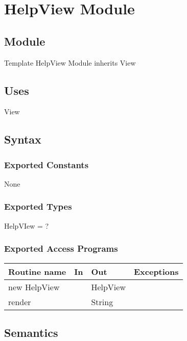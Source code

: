 \documentclass[12pt]{article}
\begin{document}
\newpage







\section* {HelpView Module}

\subsection*{Module}

Template HelpView Module inherits View

\subsection* {Uses}

View

\subsection* {Syntax}

\subsubsection* {Exported Constants}

None

\subsubsection* {Exported Types}

HelpVIew = ?

\subsubsection* {Exported Access Programs}

\begin{tabular}{| l | l | l | p{5cm} |}
\hline
\textbf{Routine name} & \textbf{In} & \textbf{Out} & \textbf{Exceptions}\\
\hline
new HelpView &  & HelpView & \\
\hline
render & & String & \\
\hline
\end{tabular}

\subsection* {Semantics}
\end{document}
